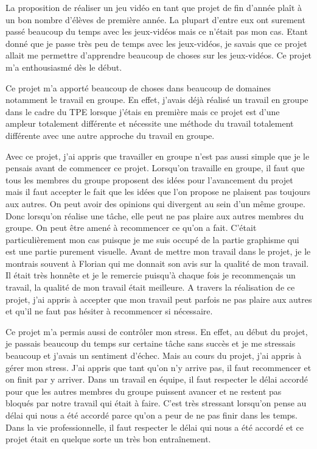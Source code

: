 \documentclass[a4paper, 12pt]{article}
\begin{document}
\par La proposition de réaliser un jeu vidéo en tant que projet de fin d’année plaît à un bon nombre d’élèves de première année. La plupart d’entre eux ont surement passé beaucoup du temps avec les jeux-vidéos mais ce n’était pas mon cas. Etant donné que je passe très peu de temps avec les jeux-vidéos, je savais que ce projet allait me permettre d’apprendre beaucoup de choses sur les jeux-vidéos. Ce projet m’a enthousiasmé dès le début.
\medbreak
\par Ce projet m’a apporté beaucoup de choses dans beaucoup de domaines notamment le travail en groupe. En effet, j’avais déjà réalisé un travail en groupe dans le cadre du TPE lorsque j’étais en première mais ce projet est d’une ampleur totalement différente et nécessite une méthode du travail totalement différente avec une autre approche du travail en groupe.
\medbreak
\par Avec ce projet, j’ai appris que travailler en groupe n’est pas aussi simple que je le pensais avant de commencer ce projet. Lorsqu’on travaille en groupe, il faut que tous les membres du groupe proposent des idées pour l’avancement du projet mais il faut accepter le fait que les idées que l’on propose ne plaisent pas toujours aux autres. On peut avoir des opinions qui divergent au sein d’un même groupe. Donc lorsqu’on réalise une tâche, elle peut ne pas plaire aux autres membres du groupe.  On peut être amené à recommencer ce qu’on a fait. C’était particulièrement mon cas puisque je me suis occupé de la partie graphisme qui est une partie purement visuelle.  Avant de mettre mon travail dans le projet, je le montrais souvent à Florian qui me donnait son avis sur la qualité de mon travail. Il était très honnête et je le remercie puisqu’à chaque fois je recommençais un travail, la qualité de mon travail était meilleure. A travers la réalisation de ce projet, j’ai appris à accepter que mon travail peut parfois ne pas plaire aux autres et qu’il ne faut pas hésiter à recommencer si nécessaire.
\medbreak
\par Ce projet m’a permis aussi de contrôler mon stress.  En effet, au début du projet, je passais beaucoup du temps sur certaine tâche sans succès et je me stressais beaucoup et j’avais un sentiment d’échec. Mais au cours du projet, j’ai appris à gérer mon stress. J’ai appris que tant qu’on n’y arrive pas, il faut recommencer et on finit par y arriver. Dans un travail en équipe, il faut respecter le délai accordé pour que les autres membres du groupe puissent avancer et ne restent pas bloqués par notre travail qui était à faire. C’est très stressant lorsqu’on pense au délai qui nous a été accordé parce qu’on a peur de ne pas finir dans les temps. Dans la vie professionnelle, il faut respecter le délai qui nous a été accordé et ce projet était en quelque sorte un très bon entraînement.
\end{document}
